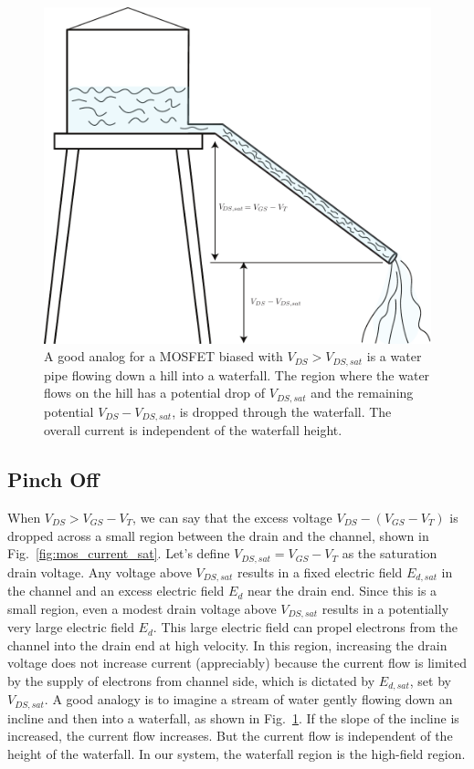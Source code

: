 \begin{figure}[tb]
\begin{center}
\includegraphics[width=.75\columnwidth]{waterfall}
\end{center}
\caption{A good analog for a MOSFET biased with $V_{DS} > V_{DS,sat}$ is a water pipe flowing down a hill into a waterfall.  The region where the water flows on the hill has a potential drop of $V_{DS,sat}$ and the remaining potential $V_{DS} - V_{DS,sat}$, is dropped through the waterfall.  The overall current is independent of the waterfall height.} \label{fig:waterfall}
\end{figure}
 




\subsection{Pinch Off}

When $V_{DS} > V_{GS}-V_T$, we can say that the excess voltage $V_{DS} - (V_{GS}-V_T)$ is dropped across a small region between the drain and the channel, shown in Fig.~\ref{fig:mos_current_sat}.  Let's define $V_{DS,sat} = V_{GS}-V_T$ as the saturation drain voltage.  Any voltage above $V_{DS,sat}$ results in a fixed electric field $E_{d,sat}$ in the channel and an excess electric field $E_{d}$ near the drain end.  Since this is a small region, even a modest drain voltage above $V_{DS,sat}$ results in a potentially very large electric field $E_d$.  This large electric field can propel electrons from the channel into the drain end at high velocity.  In this region, increasing the drain voltage does not increase current (appreciably) because the current flow is limited by the supply of electrons from channel side, which is dictated by $E_{d,sat}$, set by $V_{DS,sat}$.  A good analogy is to imagine a stream of water gently flowing down an incline and then into a waterfall, as shown in Fig.~\ref{fig:waterfall}.  If the slope of the incline is increased, the current flow increases.  But the current flow is independent of the height of the waterfall.  In our system, the waterfall region is the high-field region.  

